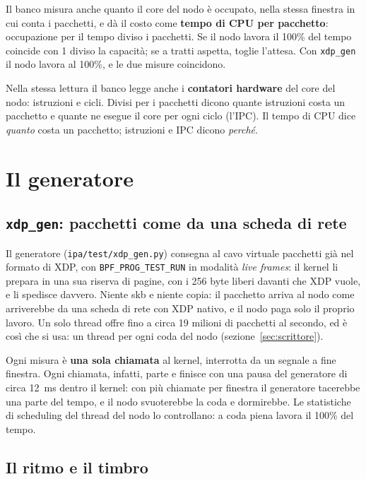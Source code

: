 \documentclass[11pt,a4paper,oneside]{report}
\begin{document}
Il banco misura anche quanto il core del nodo è occupato, nella stessa finestra in
cui conta i pacchetti, e dà il costo come \textbf{tempo di CPU per pacchetto}:
occupazione per il tempo diviso i pacchetti. Se il nodo lavora il 100\% del tempo
coincide con 1 diviso la capacità; se a tratti aspetta, toglie l'attesa. Con
\texttt{xdp\_gen} il nodo lavora al 100\%, e le due misure coincidono.

Nella stessa lettura il banco legge anche i \textbf{contatori hardware} del core
del nodo: istruzioni e cicli. Divisi per i pacchetti dicono quante istruzioni
costa un pacchetto e quante ne esegue il core per ogni ciclo (l'IPC). Il tempo
di CPU dice \emph{quanto} costa un pacchetto; istruzioni e IPC dicono
\emph{perché}.

\section{Il generatore}
\label{sec:generatori}

\subsection*{\texttt{xdp\_gen}: pacchetti come da una scheda di rete}

Il generatore (\texttt{ipa/test/xdp\_gen.py}) consegna al cavo virtuale pacchetti
già nel formato di XDP, con \texttt{BPF\_PROG\_TEST\_RUN} in modalità \emph{live
frames}: il kernel li prepara in una sua riserva di pagine, con i 256 byte liberi
davanti che XDP vuole, e li spedisce davvero. Niente skb e niente copia: il
pacchetto arriva al nodo come arriverebbe da una scheda di rete con XDP nativo, e
il nodo paga solo il proprio lavoro. Un solo thread offre fino a circa 19 milioni
di pacchetti al secondo, ed è così che si usa: un thread per ogni coda del nodo
(sezione~\ref{sec:scrittore}).

Ogni misura è \textbf{una sola chiamata} al kernel, interrotta da un segnale a
fine finestra. Ogni chiamata, infatti, parte e finisce con una pausa del
generatore di circa 12~ms dentro il kernel: con più chiamate per finestra il
generatore tacerebbe una parte del tempo, e il nodo svuoterebbe la coda e
dormirebbe. Le statistiche di scheduling del thread del nodo lo controllano: a
coda piena lavora il 100\% del tempo.

\subsection*{Il ritmo e il timbro}
\end{document}
